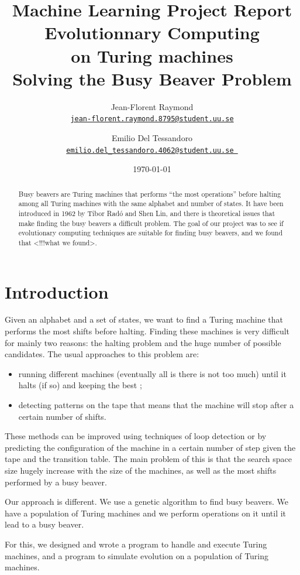 \documentclass{report}
\title{Machine Learning Project Report\\\textbf{Evolutionnary Computing\\on Turing machines}\\{\Large Solving the Busy Beaver Problem}}
\author{Jean-Florent Raymond\\\href{mailto:jean-florent.raymond.8795@student.uu.se}{\texttt{jean-florent.raymond.8795@student.uu.se}} \and Emilio Del Tessandoro\\
  \href{mailto:emilio.del_tessandoro.4062@student.uu.se }{\texttt{emilio.del\_tessandoro.4062@student.uu.se }}}
\date{\today}
\begin{document}
\maketitle

\begin{abstract}

  Busy beavers are Turing machines that performs ``the most operations'' before halting among all Turing machines with the same alphabet and number of states. It have been introduced in 1962 by Tibor Radó and Shen Lin, and there is theoretical issues that make finding the busy beavers a difficult problem.
The goal of our project was to see if evolutionary computing techniques are suitable for finding busy beavers, and we found that <!!!what we found>.

\end{abstract}

\chapter{Introduction}
\label{chap:intro}

Given an alphabet and a set of states, we want to find a Turing machine that performs the most shifts before halting. 
Finding these machines is very difficult for mainly two reasons: the halting problem and the huge number of possible candidates.
The usual approaches \cite{rado} to this problem are:
\begin{itemize}
\item running different machines (eventually all is there is not too much) until it halts (if so) and keeping the best ;
\item detecting patterns on the tape that means that the machine will stop after a certain number of shifts.
\end{itemize}
These methods can be improved using techniques of loop detection or by predicting the configuration of the machine in a certain number of step given the tape and the transition table. The main problem of this is that the search space size hugely increase with the size of the machines, as well as the most shifts performed by a busy beaver.


Our approach is different. We use a genetic algorithm to find busy beavers. We have a population of Turing machines and we perform operations on it until it lead to a busy beaver.

For this, we designed and wrote a program to handle and execute Turing machines, and a program to simulate evolution on a population of Turing machines.
\end{document}
